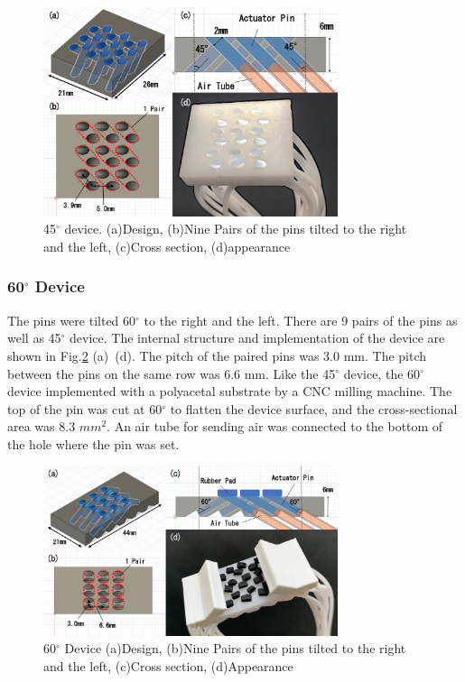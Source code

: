 \begin{figure}[h]
  \centering
  \includegraphics[width=3.4in]{images/fig_45_device}
  \caption{45$^{\circ}$ device.
(a)Design, (b)Nine Pairs of the pins tilted to the right and the left, 
(c)Cross section, (d)appearance
}
  \label{fig_45_device}
\end{figure}

\subsubsection{60$^{\circ}$ Device}
The pins were tilted 60$^{\circ}$ to the right and the left.
There are 9 pairs of the pins as well as 45$^{\circ}$ device.
The internal structure and implementation of the device are shown in Fig.\ref{fig_60_device} (a)~(d).
The pitch of the paired pins was 3.0 mm.
The pitch between the pins on the same row was 6.6 mm.
Like the 45$^{\circ}$ device, the 60$^{\circ}$ device implemented with a polyacetal substrate by a CNC milling machine.
The top of the pin was cut at 60$^{\circ}$ to flatten the device surface, and the cross-sectional area was 8.3 $mm^2$.
An air tube for sending air was connected to the bottom of the hole where the pin was set.

\begin{figure}[h]
  \centering
  \includegraphics[width=3.4in]{images/fig_60_device}
  \caption{60$^{\circ}$ Device
(a)Design, (b)Nine Pairs of the pins tilted to the right and the left,
(c)Cross section, (d)Appearance}
  \label{fig_60_device}
\end{figure}

